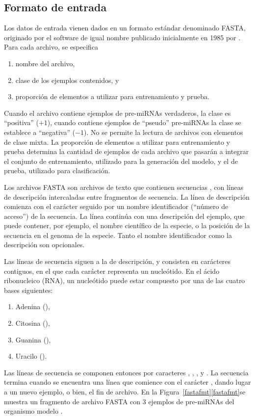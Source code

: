 %
%
%
\subsection{Formato de entrada}
%
Los datos de entrada vienen dados en un formato estándar denominado
FASTA, originado por el software de igual nombre publicado
inicialmente en 1985 por \citeauthor{fasta} \cite{fasta}.  Para cada
archivo, se especifica
%
\begin{enumerate}
\item nombre del archivo,
\item clase de los ejemplos contenidos, y
\item proporción de elementos a utilizar para entrenamiento y prueba.
\end{enumerate}
%
Cuando el archivo contiene ejemplos de pre-miRNAs verdaderos, la clase
es ``positiva'' ($+1$), cuando contiene ejemplos de ``pseudo''
pre-miRNAs la clase se establece a ``negativa'' ($-1$).  No se permite
la lectura de archivos con elementos de clase mixta.  La proporción de
elementos a utilizar para entrenamiento y prueba determina la cantidad
de ejemplos de cada archivo que pasarán a integrar el conjunto de
entrenamiento, utilizado para la generación del modelo, y el de
prueba, utilizado para clasificación.

Los archivos FASTA son archivos de texto que contienen secuencias
, con líneas de descripción intercaladas entre fragmentos
de secuencia.
La línea de descripción comienza con el carácter \mono{>} seguido por
un nombre identificador (``número de acceso'') de la secuencia.  La
línea continúa con una descripción del ejemplo, que
puede contener, por ejemplo, el nombre científico de la especie, o la
posición de la secuencia en el genoma de la especie. Tanto el nombre
identificador como la descripción son opcionales.

Las líneas de secuencia siguen a la de descripción, y consisten en
carácteres contiguos, en el que cada carácter representa un
nucleótido. En el ácido ribonucleico (RNA), un nucleótido puede estar
compuesto por una de las cuatro bases siguientes:
%
\begin{enumerate}
\item Adenina (),
\item Citosina (),
\item Guanina (),
\item Uracilo ().
\end{enumerate}
%
Las líneas de secuencia se componen entonces por caracteres ,
, , y .  La secuencia termina cuando se
encuentra una línea que comience con el carácter \mono{>}, dando lugar
a un nuevo ejemplo, o bien, el fin de archivo.
En la \iflatexml{}Figura~\ref{fastafmt}\else\autoref{fastafmt}\fi se
muestra un fragmento de archivo FASTA
con 3 ejemplos de pre-miRNAs del organismo modelo .
